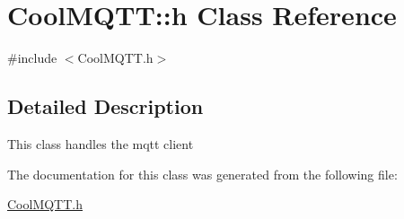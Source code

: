 \hypertarget{class_cool_m_q_t_t_1_1h}{}\section{Cool\+M\+Q\+TT\+:\+:h Class Reference}
\label{class_cool_m_q_t_t_1_1h}


{\ttfamily \#include $<$Cool\+M\+Q\+T\+T.\+h$>$}



\subsection{Detailed Description}
This class handles the mqtt client 

The documentation for this class was generated from the following file\+:\begin{DoxyCompactItemize}
\item 
\hyperlink{_cool_m_q_t_t_8h}{Cool\+M\+Q\+T\+T.\+h}\end{DoxyCompactItemize}
